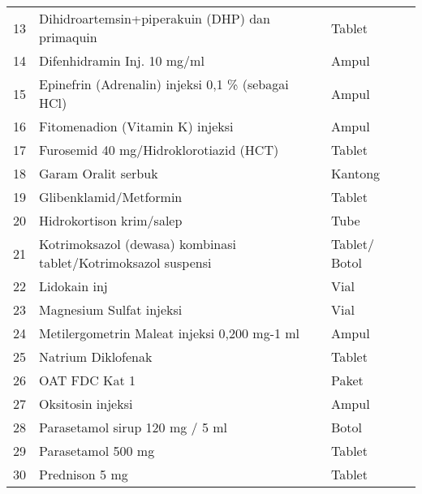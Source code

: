{\begin{tabular}{cY{20em}Y{8em}Z{8em}}
	13 & Dihidroartemsin+piperakuin (DHP) dan primaquin                 & Tablet            & \checkmark \\
	14 & Difenhidramin Inj. 10 mg/ml                                    & Ampul             & \checkmark \\
	15 & Epinefrin (Adrenalin) injeksi  0,1 \% (sebagai HCl)            & Ampul             & \checkmark \\
	16 & Fitomenadion (Vitamin K) injeksi                               & Ampul             & \checkmark \\
	17 & Furosemid 40 mg/Hidroklorotiazid (HCT)                         & Tablet            & \checkmark \\
	18 & Garam Oralit  serbuk                                           & Kantong           & \checkmark \\
	19 & Glibenklamid/Metformin                                         & Tablet            & \checkmark \\
	20 & Hidrokortison krim/salep                                       & Tube              & \checkmark \\
	21 & Kotrimoksazol (dewasa) kombinasi tablet/Kotrimoksazol suspensi & Tablet/ Botol       & \checkmark \\
	22 & Lidokain inj                                                   & Vial              & \checkmark \\
	23 & Magnesium Sulfat injeksi                                       & Vial              & \checkmark \\
	24 & Metilergometrin Maleat injeksi  0,200 mg-1 ml                  & Ampul             & \checkmark \\
	25 & Natrium Diklofenak                                             & Tablet            & \checkmark \\
	26 & OAT FDC Kat 1                                                  & Paket             & \checkmark \\
	27 & Oksitosin injeksi                                              & Ampul             & \checkmark \\
	28 & Parasetamol sirup 120 mg / 5 ml                                & Botol             & \checkmark \\
	29 & Parasetamol 500 mg                                             & Tablet            & \checkmark \\
	30 & Prednison 5 mg                                                 & Tablet            & \checkmark \\

\end{tabular}}
